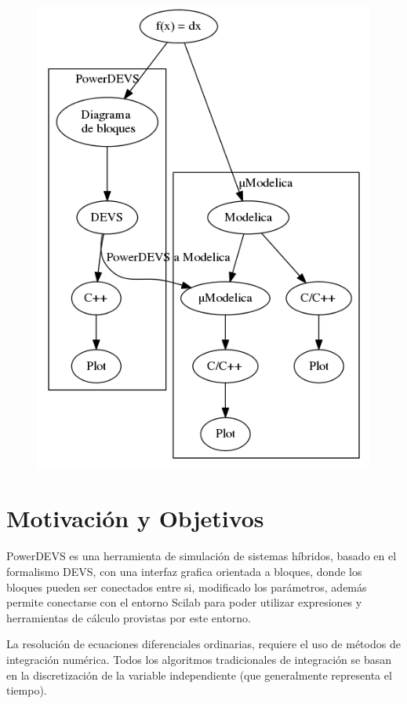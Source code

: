 \documentclass[a4paper,	11pt]{report}
\begin{document}
\begin{figure}[H]
\centering
 \includegraphics[width=\linewidth]{esquema}
\end{figure}


\section{Motivación y Objetivos}
PowerDEVS\cite{BK11} es una herramienta de simulación de sistemas híbridos, basado en el formalismo DEVS\cite{Zeigler:2000:TMS:580780}, con una interfaz grafica orientada a bloques, donde los bloques pueden ser conectados entre si, modificado los parámetros, además permite conectarse con el entorno Scilab para poder utilizar expresiones y herramientas de cálculo provistas por este entorno.

La resolución de ecuaciones diferenciales ordinarias, requiere el uso de métodos de integración numérica. Todos los algoritmos tradicionales de integración se basan en la discretización de la variable independiente (que generalmente representa el tiempo).
\end{document}
